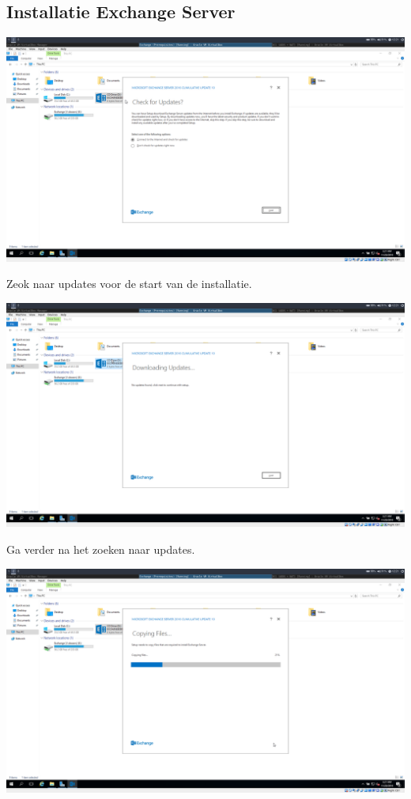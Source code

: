 \documentclass[a4paper]{article}
\begin{document}
\subsection{Installatie Exchange Server}	
\begin{center}
	\includegraphics[width=15cm]{Pictures/Exchange/install/1542712869.png}
	
Zeok naar updates voor de start van de installatie.
\end{center}
\begin{center}
	\includegraphics[width=15cm]{Pictures/Exchange/install/1542712875.png}
	
	Ga verder na het zoeken naar updates.
\end{center}
\begin{center}
	\includegraphics[width=15cm]{Pictures/Exchange/install/1542712878.png}
	
	
\end{center}
\end{document}

